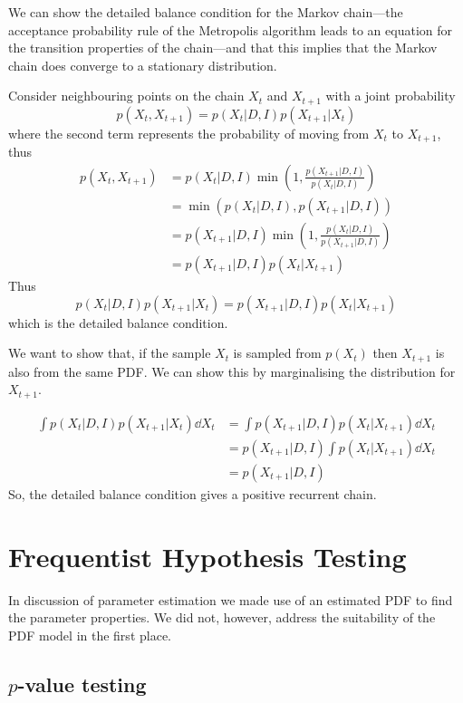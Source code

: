 \documentclass{dwnotes}         		        %
\begin{document}
We can show the detailed balance condition for the Markov chain---the
acceptance probability rule of the Metropolis algorithm leads to an
equation for the transition properties of the chain---and that this
implies that the Markov chain does converge to a stationary
distribution.

Consider neighbouring points on the chain $X_t$ and $X_{t+1}$ with a
joint probability
\[ p(X_t, X_{t+1}) = p(X_t|D,I)p(X_{t+1}| X_t) \] where the second
term represents the probability of moving from $X_t$ to $X_{t+1}$, thus
\begin{align*}
  p(X_t, X_{t+1}) &= p(X_t | D, I) \min( 1, \frac{p(X_{t+1} | D,I)}{p(X_t|D,I)}) \\
&= \min(p (X_t | D,I) , p(X_{t+1}|D,I) ) \\
&= p(X_{t+1} | D,I) \min(1, \frac{p(X_t | D,I )}{p(X_{t+1}| D,I)} ) \\
&= p(X_{t+1} | D,I) p(X_t|X_{t+1} )
\end{align*}
Thus
\[ p(X_t | D,I) p(X_{t+1} | X_t) = p(X_{t+1} | D,I) p(X_t | X_{t+1}) \]
which is the detailed balance condition.

We want to show that, if the sample $X_t$ is sampled from $p(X_t)$
then $X_{t+1}$ is also from the same PDF. We can show this by
marginalising the distribution for $X_{t+1}$.

\begin{align*} 
\int p(X_t | D,I) p(X_{t+1} | X_t) \dd{X_t} &= \int p(X_{t+1} | D,I) p (X_t | X_{t+1}) \dd{X_t} \\
&= p(X_{t+1} | D,I) \int p(X_t | X_{t+1}) \dd{X_t} \\
&= p(X_{t+1} | D,I)
\end{align*}
So, the detailed balance condition gives a positive recurrent chain.

\section{Frequentist Hypothesis Testing}
\label{sec:freq-hypoth-test}

In discussion of parameter estimation we made use of an estimated PDF
to find the parameter properties. We did not, however, address the
suitability of the PDF model in the first place.

\subsection{$p$-value testing}
\label{sec:p-value-analysis}
\end{document}
